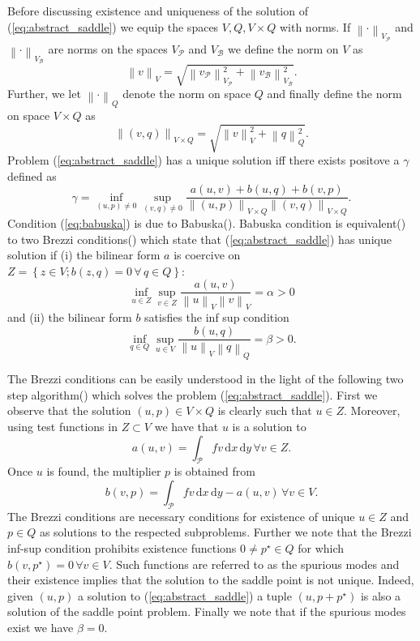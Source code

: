 \documentclass[a4paper,10pt]{article}
\newcommand{\norm}[1]{\ensuremath{\left\|#1\right\|}}
\newcommand{\meas}[1]{\ensuremath{\,\mathrm{d}#1}}
\newcommand{\Vp}{\ensuremath{V_{\mathcal{P}}}}
\newcommand{\Vb}{\ensuremath{V_{\mathcal{B}}}}
\newcommand{\vp}{\ensuremath{v_{\mathcal{P}}}}
\newcommand{\vb}{\ensuremath{v_{\mathcal{B}}}}
\begin{document}
  Before discussing existence and uniqueness of the solution of
  (\ref{eq:abstract_saddle}) we equip the spaces $V, Q, V\times Q$ with norms.
  If $\norm{\cdot}_{\Vp}$ and $\norm{\cdot}_{\Vb}$ are norms on the spaces $\Vp$
  and $\Vb$ we define the norm on $V$ as 
  \[
    \norm{v}_V=\sqrt{\norm{\vp}^2_{\Vp} + \norm{\vb}^2_{\Vb}}.
  \] Further, we let $\norm{\cdot}_{Q}$
  denote the norm on space $Q$ and finally define the norm on space $V\times Q$
  as 
  \[
    \norm{(v, q)}_{V\times Q}=\sqrt{\norm{v}^2_V +\norm{q}^2_Q}.
  \]
  Problem (\ref{eq:abstract_saddle}) has a unique solution iff there exists
  positove a $\gamma$ defined as
  \begin{equation}
    \label{eq:babuska}
    \gamma=\inf_{(u, p)\neq 0}\sup_{(v, q) \neq 0}
    \frac{a(u, v) + b(u, q) + b(v, p)}
    {\norm{(u, p)}_{V\times Q}  \norm{(v, q)}_{V\times Q}}.
  \end{equation}
  Condition (\ref{eq:babuska}) is due to Babuska(\cite{babuska_error,
  babuska_lag}). Babuska condition is equivalent(\cite{equiv}) to two Brezzi
  conditions(\cite{brezzi}) which
  state that (\ref{eq:abstract_saddle}) has unique solution if (i) the
  bilinear form $a$ is coercive on $Z=\left\{z\in V; b(z, q)=0\,\forall\,q\in Q\right\}$:
  \begin{equation}
    \label{eq:brezzi_coer}
    \inf_{u\in Z}\sup_{v\in Z} \frac{a(u, v)}{\norm{u}_V\norm{v}_V} = \alpha > 0
  \end{equation}
  and (ii) the bilinear form $b$ satisfies the inf sup condition
  \begin{equation}
    \label{eq:brezzi_infsup}
    \inf_{q\in Q}\sup_{u \in V} \frac{b(u, q)}{\norm{u}_V\norm{q}_Q}
    = \beta > 0.
  \end{equation}
  
  The Brezzi conditions can be easily understood in the light of the following
  two step algorithm(\cite{scott}) which solves the problem (\ref{eq:abstract_saddle}). First
  we observe that the solution $(u, p)\in V\times Q$ is clearly such that
  $u\in Z$. Moreover, using test functions in $Z\subset V$ we have that $u$
  is a solution to
  \[
    a(u, v) = \int_{\mathcal{P}} f v\meas{x}\meas{y}\,\forall v\in Z.
  \]
  Once $u$ is found, the multiplier $p$ is obtained from
  \[
    b(v, p) = \int_{\mathcal{P}} f v\meas{x}\meas{y} - a(u, v)\,\forall v\in V.
  \]
  The Brezzi conditions are necessary conditions for existence of unique
  $u\in Z$ and $p\in Q$ as solutions to the respected subproblems. Further
  we note that the Brezzi inf-sup condition prohibits existence functions
  $0\neq p^{\star}\in Q$ for which $b(v, p^{\star})=0\,\forall v\in V$.
  Such functions are referred to as the spurious modes and their existence
  implies that the solution to the saddle point is not unique. Indeed, given
  $(u, p)$ a solution to (\ref{eq:abstract_saddle}) a tuple $(u, p+p^{\star})$
  is also a solution of the saddle point problem. Finally we note that if
  the spurious modes exist we have $\beta=0$.
\end{document}
